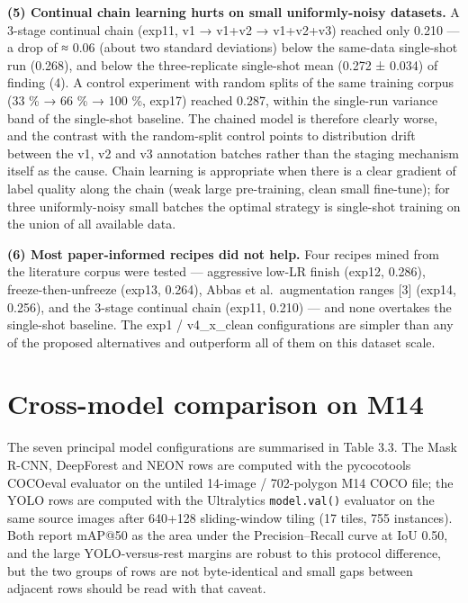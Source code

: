 \textbf{(5) Continual chain learning hurts on small uniformly-noisy datasets.} A 3-stage continual chain (exp11, v1 → v1+v2 → v1+v2+v3) reached only 0.210 --- a drop of ≈ 0.06 (about two standard deviations) below the same-data single-shot run (0.268), and below the three-replicate single-shot mean (0.272 ± 0.034) of finding (4). A control experiment with random splits of the same training corpus (33 \% → 66 \% → 100 \%, exp17) reached 0.287, within the single-run variance band of the single-shot baseline. The chained model is therefore clearly worse, and the contrast with the random-split control points to distribution drift between the v1, v2 and v3 annotation batches rather than the staging mechanism itself as the cause. Chain learning is appropriate when there is a clear gradient of label quality along the chain (weak large pre-training, clean small fine-tune); for three uniformly-noisy small batches the optimal strategy is single-shot training on the union of all available data.

\textbf{(6) Most paper-informed recipes did not help.} Four recipes mined from the literature corpus were tested --- aggressive low-LR finish (exp12, 0.286), freeze-then-unfreeze (exp13, 0.264), Abbas et al.~augmentation ranges {[}3{]} (exp14, 0.256), and the 3-stage continual chain (exp11, 0.210) --- and none overtakes the single-shot baseline. The exp1 / v4\_x\_clean configurations are simpler than any of the proposed alternatives and outperform all of them on this dataset scale.

\section{Cross-model comparison on M14}\label{cross-model-comparison-on-m14}

The seven principal model configurations are summarised in Table 3.3. The Mask R-CNN, DeepForest and NEON rows are computed with the pycocotools COCOeval evaluator on the untiled 14-image / 702-polygon M14 COCO file; the YOLO rows are computed with the Ultralytics \texttt{model.val()} evaluator on the same source images after 640+128 sliding-window tiling (17 tiles, 755 instances). Both report mAP@50 as the area under the Precision--Recall curve at IoU 0.50, and the large YOLO-versus-rest margins are robust to this protocol difference, but the two groups of rows are not byte-identical and small gaps between adjacent rows should be read with that caveat.

